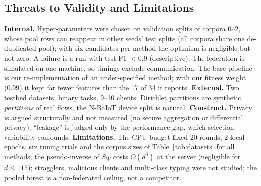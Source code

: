 \subsection{Threats to Validity and Limitations}
\textbf{Internal.} Hyper-parameters were chosen on validation splits of corpora 0--2, whose pool rows can reappear in other seeds' test splits (all corpora share one de-duplicated pool); with six candidates per method the optimism is negligible but not zero. A failure is a run with test F1 $<0.9$ (descriptive). The federation is simulated on one machine, so timings exclude communication. The base pipeline~\cite{karunamurthy2025} is our re-implementation of an under-specified method; with our fitness weight (0.99) it kept far fewer features than the 17 of 34 it reports. \textbf{External.} Two testbed datasets, binary tasks, 9--10 clients; Dirichlet partitions are synthetic \emph{partitions} of real flows, the N-BaIoT device split is natural. \textbf{Construct.} Privacy is argued structurally and not measured (no secure aggregation or differential privacy); ``leakage'' is judged only by the performance gap, which selection variability confounds. \textbf{Limitations.} The CPU budget fixed 20 rounds, 2 local epochs, six tuning trials and the corpus sizes of Table~\ref{tab:datasets} for all methods; the pseudo-inverse of $S_W$ costs $O(d^3)$ at the server (negligible for $d\le115$); stragglers, malicious clients and multi-class typing were not studied; the pooled forest is a non-federated ceiling, not a competitor.
